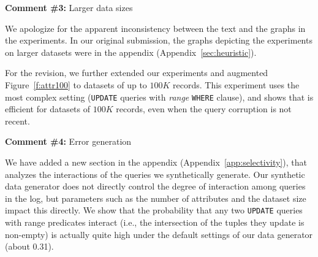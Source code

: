 \comskip

\noindent
\textbf{Comment \#3:} Larger data sizes
\begin{quote}
\end{quote}

We apologize for the apparent inconsistency between the text and the graphs in
the experiments. In our original submission, the graphs depicting the
experiments on larger datasets were in the appendix
(Appendix~\ref{sec:heuristic}).

For the revision, we further extended our experiments and augmented
Figure~\ref{f:attr100} to datasets of up to $100K$ records. This experiment
uses the most complex setting (\texttt{UPDATE} queries with \textit{range}
\texttt{WHERE} clause), and shows that \sys is efficient for datasets of
$100K$ records, even when the query corruption is not recent.



\comskip

\noindent
\textbf{Comment \#4:} Error generation
\begin{quote}
\end{quote}

We have added a new section in the appendix (Appendix~\ref{app:selectivity}),
that analyzes the interactions of the queries we synthetically generate. Our
synthetic data generator does not directly control the degree of interaction
among queries in the log, but parameters such as the number of attributes and
the dataset size impact this directly. We show that the probability that any
two \texttt{UPDATE} queries with range predicates interact (i.e., the
intersection of the tuples they update is non-empty) is actually quite high
under the default settings of our data generator (about 0.31).

